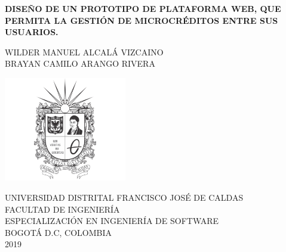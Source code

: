 \begin{titlepage}
	\begin{center}
	\textbf{DISEÑO DE UN PROTOTIPO DE PLATAFORMA WEB, QUE PERMITA LA GESTIÓN DE MICROCRÉDITOS ENTRE SUS USUARIOS.}\\
	\vspace{5cm}
	
	{WILDER MANUEL ALCALÁ VIZCAINO}\\
	{BRAYAN CAMILO ARANGO RIVERA}\\ 
	\vspace{4cm}
	
	\includegraphics[width=0.4\textwidth]{start/Universidad}\\
	\vspace{0.5cm}
	
	{UNIVERSIDAD DISTRITAL FRANCISCO JOSÉ DE CALDAS}\\
	{FACULTAD DE INGENIERÍA}\\
	{ESPECIALIZACIÓN EN INGENIERÍA DE SOFTWARE}\\
	{BOGOTÁ D.C, COLOMBIA}\\
	{2019}\\
	\end{center}
\end{titlepage}